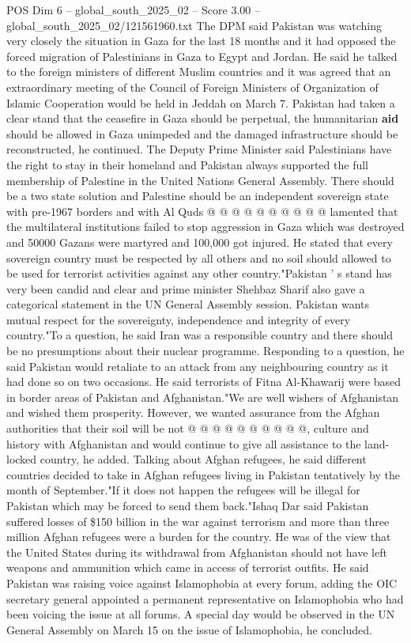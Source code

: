 \begin{textsample}{POS Dim 6 – global\_south\_2025\_02 – Score 3.00 – global\_south\_2025\_02/121561960.txt}
The DPM said Pakistan was watching very closely the situation in Gaza for the last 18 months and it had opposed the forced migration of Palestinians in Gaza to Egypt and Jordan.
He said he talked to the foreign ministers of different Muslim countries and it was agreed that an extraordinary meeting of the Council of Foreign Ministers of Organization of Islamic Cooperation would be held in Jeddah on March 7.
Pakistan had taken a clear stand that the ceasefire in Gaza should be perpetual, the humanitarian \textbf{aid} should be allowed in Gaza unimpeded and the damaged infrastructure should be reconstructed, he continued.
The Deputy Prime Minister said Palestinians have the right to stay in their homeland and Pakistan always supported the full membership of Palestine in the United Nations General Assembly.
There should be a two state solution and Palestine should be an independent sovereign state with pre-1967 borders and with Al Quds @ @ @ @ @ @ @ @ @ @ lamented that the multilateral institutions failed to stop aggression in Gaza which was destroyed and 50000 Gazans were martyred and 100,000 got injured.
He stated that every sovereign country must be respected by all others and no soil should allowed to be used for terrorist activities against any other country."Pakistan ' s stand has very been candid and clear and prime minister Shehbaz Sharif also gave a categorical statement in the UN General Assembly session.
Pakistan wants mutual respect for the sovereignty, independence and integrity of every country."To a question, he said Iran was a responsible country and there should be no presumptions about their nuclear programme.
Responding to a question, he said Pakistan would retaliate to an attack from any neighbouring country as it had done so on two occasions.
He said terrorists of Fitna Al-Khawarij were based in border areas of Pakistan and Afghanistan."We are well wishers of Afghanistan and wished them prosperity.
However, we wanted assurance from the Afghan authorities that their soil will be not @ @ @ @ @ @ @ @ @ @, culture and history with Afghanistan and would continue to give all assistance to the land-locked country, he added.
Talking about Afghan refugees, he said different countries decided to take in Afghan refugees living in Pakistan tentatively by the month of September."If it does not happen the refugees will be illegal for Pakistan which may be forced to send them back."Ishaq Dar said Pakistan suffered losses of \$150 billion in the war against terrorism and more than three million Afghan refugees were a burden for the country.
He was of the view that the United States during its withdrawal from Afghanistan should not have left weapons and ammunition which came in access of terrorist outfits.
He said Pakistan was raising voice against Islamophobia at every forum, adding the OIC secretary general appointed a permanent representative on Islamophobia who had been voicing the issue at all forums.
A special day would be observed in the UN General Assembly on March 15 on the issue of Islamophobia, he concluded.

\end{textsample}
